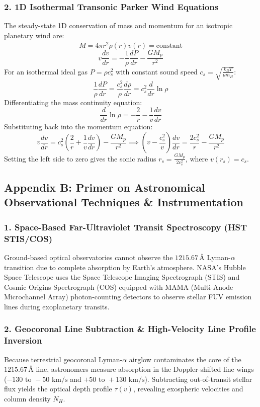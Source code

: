 \documentclass[11pt,a4paper]{article}
\begin{document}
\subsubsection*{2. 1D Isothermal Transonic Parker Wind Equations}
The steady-state 1D conservation of mass and momentum for an isotropic planetary wind are:
\begin{equation}
\dot{M} = 4\pi r^2 \rho(r) v(r) = \text{constant}
\end{equation}
\begin{equation}
v \frac{dv}{dr} = -\frac{1}{\rho} \frac{dP}{dr} - \frac{G M_p}{r^2}
\end{equation}
For an isothermal ideal gas $P = \rho c_s^2$ with constant sound speed $c_s = \sqrt{\frac{k_B T}{\mu m_H}}$:
\begin{equation}
\frac{1}{\rho} \frac{dP}{dr} = \frac{c_s^2}{\rho} \frac{d\rho}{dr} = c_s^2 \frac{d}{dr} \ln \rho
\end{equation}
Differentiating the mass continuity equation:
\begin{equation}
\frac{d}{dr} \ln \rho = -\frac{2}{r} - \frac{1}{v} \frac{dv}{dr}
\end{equation}
Substituting back into the momentum equation:
\begin{equation}
v \frac{dv}{dr} = c_s^2 \left( \frac{2}{r} + \frac{1}{v} \frac{dv}{dr} \right) - \frac{G M_p}{r^2} \implies \left( v - \frac{c_s^2}{v} \right) \frac{dv}{dr} = \frac{2 c_s^2}{r} - \frac{G M_p}{r^2}
\end{equation}
Setting the left side to zero gives the sonic radius $r_s = \frac{G M_p}{2 c_s^2}$, where $v(r_s) = c_s$.

\subsection*{Appendix B: Primer on Astronomical Observational Techniques \& Instrumentation}

\subsubsection*{1. Space-Based Far-Ultraviolet Transit Spectroscopy (HST STIS/COS)}
Ground-based optical observatories cannot observe the $1215.67\,\text{\AA}$ Lyman-$\alpha$ transition due to complete absorption by Earth's atmosphere. NASA's Hubble Space Telescope uses the Space Telescope Imaging Spectrograph (STIS) and Cosmic Origins Spectrograph (COS) equipped with MAMA (Multi-Anode Microchannel Array) photon-counting detectors to observe stellar FUV emission lines during exoplanetary transits.

\subsubsection*{2. Geocoronal Line Subtraction \& High-Velocity Line Profile Inversion}
Because terrestrial geocoronal Lyman-$\alpha$ airglow contaminates the core of the $1215.67\,\text{\AA}$ line, astronomers measure absorption in the Doppler-shifted line wings ($-130\text{ to }-50\text{ km/s}$ and $+50\text{ to }+130\text{ km/s}$). Subtracting out-of-transit stellar flux yields the optical depth profile $\tau(v)$, revealing exospheric velocities and column density $N_H$.
\end{document}
